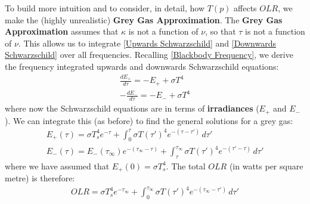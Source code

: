 To build more intuition and to consider, in detail, how $T(p)$ affects $OLR$, we make the (highly unrealistic) \textbf{Grey Gas Approximation}. The \textbf{Grey Gas Approximation} assumes that $\kappa$ is not a function of $\nu$, so that $\tau$ is not a function of $\nu$. This allows us to integrate \ref{Upwards Schwarzschild} and \ref{Downwards Schwarzschild} over all frequencies. Recalling \ref{Blackbody Frequency}, we derive the frequency integrated upwards and downwards Schwarzschild equations:
\begin{align}
    \frac{dE_+}{d\tau}=-E_++\sigma T^4 \label{Upwards Grey}\\
    -\frac{dE_-}{d\tau}=-E_-+\sigma T^4\label{Downwards Grey}
\end{align}
where now the Schwarzschild equations are in terms of \textbf{irradiances} ($E_+$ and $E_-$). We can integrate this (as before) to find the general solutions for a grey gas:
\begin{align}
    E_+(\tau)=\sigma T_s^4e^{-\tau}+
    \int_0^{\tau}
    \sigma T(\tau')^4
    e^{-(\tau-\tau')}
    \,d\tau'\label{Upwards Soln Grey General}
    \\
    E_-(\tau)=E_-(\tau_\infty)
    e^{-(\tau_\infty-\tau)}
    +
    \int_{\tau}^{\tau_\infty}
    \sigma T(\tau')^4
    e^{-(\tau'-\tau)}
    \,d\tau' 
    \label{Downwards Soln Grey General}
\end{align}
where we have assumed that $E_+(0)=\sigma T_s^4$. The total $OLR$ (in watts per square metre) is therefore:
\begin{align}
    \label{Grey OLR}
    OLR = \sigma T_s^4e^{-\tau_\infty}+
    \int_0^{\tau_\infty}
    \sigma T(\tau')^4
    e^{-(\tau_\infty-\tau')}
    \,d\tau'
\end{align}

